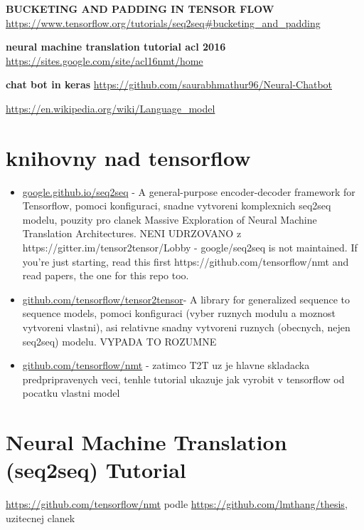 \textbf{BUCKETING AND PADDING IN TENSOR FLOW}
\url{https://www.tensorflow.org/tutorials/seq2seq#bucketing_and_padding}

\textbf{neural machine translation tutorial acl 2016}
\url{https://sites.google.com/site/acl16nmt/home}

\textbf{chat bot in keras}
\url{https://github.com/saurabhmathur96/Neural-Chatbot}

\url{https://en.wikipedia.org/wiki/Language_model}

\section{knihovny nad tensorflow}
\begin{itemize}
  \item \url{google.github.io/seq2seq} - A general-purpose encoder-decoder framework for Tensorflow, pomoci konfiguraci, snadne vytvoreni komplexnich seq2seq modelu, pouzity pro clanek Massive Exploration of Neural Machine Translation Architectures. NENI UDRZOVANO z https://gitter.im/tensor2tensor/Lobby -  google/seq2seq is not maintained. If you're just starting, read this first https://github.com/tensorflow/nmt and read papers, the one for this repo too.
  \item \url{github.com/tensorflow/tensor2tensor}- A library for generalized sequence to sequence models, pomoci konfiguraci (vyber ruznych modulu a moznost vytvoreni vlastni), asi relativne snadny vytvoreni ruznych (obecnych, nejen seq2seq) modelu. VYPADA TO ROZUMNE
  \item \url{github.com/tensorflow/nmt} - zatimco T2T uz je hlavne skladacka predpripravenych veci, tenhle tutorial ukazuje jak vyrobit v tensorflow od pocatku vlastni model
\end{itemize}


\section {Neural Machine Translation (seq2seq) Tutorial}
\url{https://github.com/tensorflow/nmt} podle \url{https://github.com/lmthang/thesis}, uzitecnej clanek

